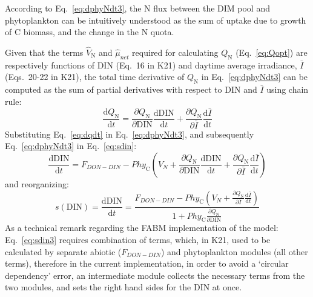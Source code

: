 \documentclass[gmd, manuscript]{copernicus}
\begin{document}
According to Eq.~\ref{eq:dphyNdt3}, the N flux between the DIM pool and phytoplankton can be intuitively understood as the sum of uptake due to growth of C biomass, and the change in the N quota. %

Given that the terms $\hat{V}_\text{N}$ and $\hat{\mu}_{net}$ required for calculating $Q_\text{N}$ (Eq.~\ref{eq:Qopt}) are respectively functions of DIN (Eq.~16 in K21) and daytime average irradiance, $\bar{I}$ (Eqs.~20-22 in K21), the total time derivative of $Q_\text{N}$ in Eq.~\ref{eq:dphyNdt3} can be computed as the sum of partial derivatives with respect to DIN and $\bar{I}$ using chain rule: 
\begin{equation} \label{eq:dqdt}
 \frac{\text{d} Q_\text{N}}{\text{d} t} = \frac{\partial Q_\text{N}}{\partial \text{DIN}} \frac{\text{d} \text{DIN}}{\text{d} t} +  \frac{\partial Q_\text{N}}{\partial \bar{I}} \frac{\text{d} \bar{I}}{\text{d} t} 
\end{equation}
Substituting Eq.~\ref{eq:dqdt} in Eq.~\ref{eq:dphyNdt3}, and subsequently Eq.~\ref{eq:dphyNdt3} in Eq.~\ref{eq:sdin}:
\begin{equation}\label{eq:sdin2}
 \frac{\text{d}\text{DIN}}{\text{d}t} = F_{DON-DIN} - Phy_{\text{C}} \left(V_N + \frac{\partial Q_\text{N}}{\partial \text{DIN}} \frac{\text{d} \text{DIN}}{\text{d} t} +  \frac{\partial Q_\text{N}}{\partial \bar{I}} \frac{\text{d} \bar{I}}{\text{d} t} \right)
\end{equation}
and reorganizing:
\begin{equation}\label{eq:sdin3}
 s(\text{DIN}) = \frac{\text{d}\text{DIN}}{\text{d}t} = \frac{F_{DON-DIN} - Phy_{\text{C}} \left(V_N +  \frac{\partial Q_\text{N}}{\partial \bar{I}} \frac{\text{d} \bar{I}}{\text{d} t} \right)}{ 1+Phy_{\text{C}}\frac{\partial Q_\text{N}}{\partial \text{DIN}}}
\end{equation}
As a technical remark regarding the FABM implementation of the model: Eq.~\ref{eq:sdin3} requires combination of terms, which, in K21, used to be calculated by separate abiotic ($F_{DON-DIN}$) and phytoplankton modules (all other terms), therefore in the current implementation, in order to avoid a `circular dependency' error, an intermediate module collects the necessary terms from the two modules, and sets the right hand sides for the DIN at once.
\end{document}
